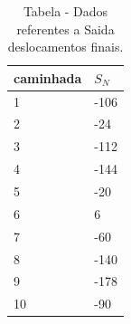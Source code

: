 \begin{table}[H]
\centering
\caption{Tabela - Dados referentes a Saida deslocamentos finais.}
\label{tab:saida_deslocamentos_finais}
\begin{tabular}{ll}
\toprule
caminhada & $S_N$ \\
\midrule
1 & -106 \\
2 & -24 \\
3 & -112 \\
4 & -144 \\
5 & -20 \\
6 & 6 \\
7 & -60 \\
8 & -140 \\
9 & -178 \\
10 & -90 \\
\bottomrule
\end{tabular}

\end{table}
